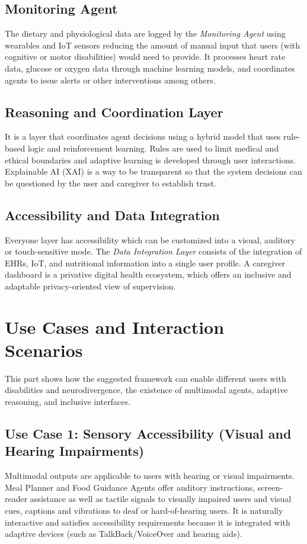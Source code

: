 \documentclass[pdflatex,sn-mathphys-num]{sn-jnl}
\begin{document}
\subsection{Monitoring Agent}

The dietary and physiological data are logged by the \emph{Monitoring Agent} using wearables and IoT sensors reducing the amount of manual input that users (with cognitive or motor disabilities) would need to provide. 
It processes heart rate data, glucose or oxygen data through machine learning models, and coordinates agents to issue alerts or other interventions among others.

\subsection{Reasoning and Coordination Layer}

It is a layer that coordinates agent decisions using a hybrid model that uses rule-based logic and reinforcement learning. Rules are used to limit medical and ethical boundaries and adaptive learning is developed through user interactions. Explainable AI (XAI) is a way to be transparent so that the system decisions can be questioned by the user and caregiver to establish trust.

\subsection{Accessibility and Data Integration}

Everyone layer has accessibility which can be customized into a visual, auditory or touch-sensitive mode. 
The \emph{Data Integration Layer} consists of the integration of EHRs, IoT, and nutritional information into a single user profile. A caregiver dashboard is a privative digital health ecosystem, which offers an inclusive and adaptable privacy-oriented view of supervision.

\section{Use Cases and Interaction Scenarios}

This part shows how the suggested framework can enable different users with disabilities and neurodivergence, the existence of multimodal agents, adaptive reasoning, and inclusive interfaces.

\subsection{Use Case 1: Sensory Accessibility (Visual and Hearing Impairments)}
Multimodal outputs are applicable to users with hearing or visual impairments. Meal Planner and Food Guidance Agents offer auditory instructions, screen-reader assistance as well as tactile signals to visually impaired users and visual cues, captions and vibrations to deaf or hard-of-hearing users. It is naturally interactive and satisfies accessibility requirements because it is integrated with adaptive devices (such as TalkBack/VoiceOver and hearing aids).
\end{document}
